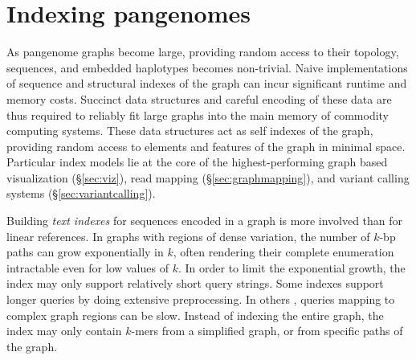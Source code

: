 \section{Indexing pangenomes} %
\label{sec:indexing}

As pangenome graphs become large, providing random access to their topology, sequences, and embedded haplotypes becomes non-trivial.
Naive implementations of sequence and structural indexes of the graph can incur significant runtime and memory costs.
Succinct data structures and careful encoding of these data are thus required to reliably fit large graphs into the main memory of commodity computing systems.
These data structures act as self indexes of the graph, providing random access to elements and features of the graph in minimal space.
Particular index models lie at the core of the highest-performing graph based visualization (\S \ref{sec:viz}), read mapping (\S \ref{sec:graphmapping}), and variant calling systems (\S \ref{sec:variantcalling}).

Building \emph{text indexes} for sequences encoded in a graph is more involved than for linear references.
In graphs with regions of dense variation, the number of $k$-bp paths can grow exponentially in $k$, often rendering their complete enumeration intractable even for low values of $k$.
In order to limit the exponential growth, the index may only support relatively short query strings.
Some indexes \cite{Siren_2014} support longer queries by doing extensive preprocessing.
In others \cite{Thachuk_2013,Huang_2013,Maciuca_2016}, queries mapping to complex graph regions can be slow.
Instead of indexing the entire graph, the index may only contain $k$-mers from a simplified graph, or from specific paths of the graph.

